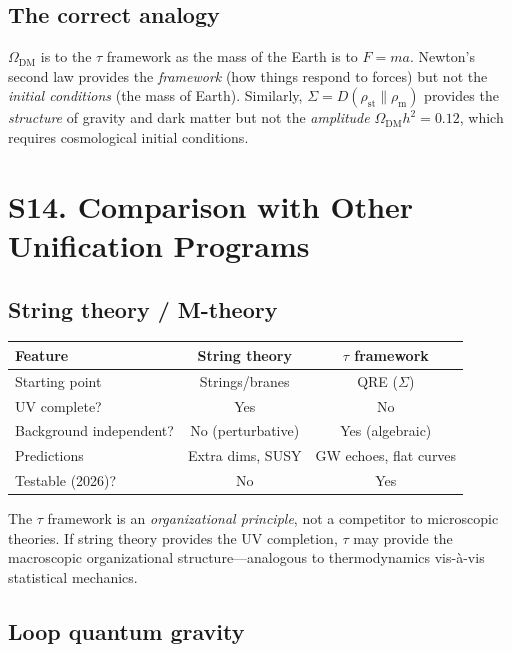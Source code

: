 \documentclass[aps,prd,preprint,superscriptaddress,longbibliography]{revtex4-2}
\newcommand{\KL}{D}
\newcommand{\tauasym}{\tau}
\begin{document}
\subsection{The correct analogy}

$\Omega_{\mathrm{DM}}$ is to the $\tauasym$ framework as the mass
of the Earth is to $F=ma$.  Newton's second law provides the
\emph{framework} (how things respond to forces) but not the
\emph{initial conditions} (the mass of Earth).  Similarly,
$\Sigma = \KL(\rho_{\mathrm{st}}\|\rho_{\mathrm{m}})$ provides the
\emph{structure} of gravity and dark matter but not the
\emph{amplitude} $\Omega_{\mathrm{DM}}h^2 = 0.12$, which requires
cosmological initial conditions.

\section{S14. Comparison with Other Unification Programs}
\label{sec:comparison}

\subsection{String theory / M-theory}

\begin{center}
\begin{tabular}{lcc}
\toprule
Feature & String theory & $\tauasym$ framework \\
\midrule
Starting point & Strings/branes & QRE ($\Sigma$) \\
UV complete? & Yes & No \\
Background independent? & No (perturbative) & Yes (algebraic) \\
Predictions & Extra dims, SUSY & GW echoes, flat curves \\
Testable (2026)? & No & Yes \\
\bottomrule
\end{tabular}
\end{center}

The $\tauasym$ framework is an \emph{organizational principle}, not a
competitor to microscopic theories.  If string theory provides the
UV completion, $\tauasym$ may provide the macroscopic organizational
structure---analogous to thermodynamics vis-\`{a}-vis statistical
mechanics.

\subsection{Loop quantum gravity}
\end{document}

